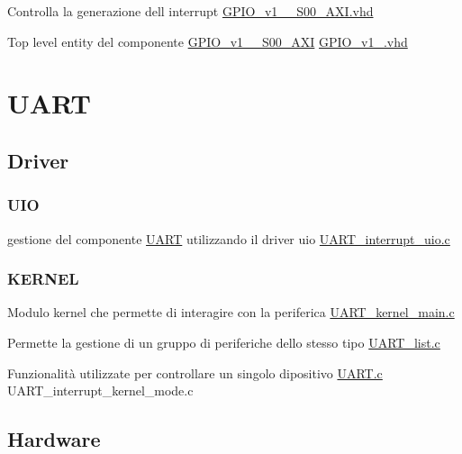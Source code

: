 \begin{DoxyItemize}
\item Controlla la generazione dell\textquotesingle{} interrupt \hyperlink{GPIO__v1__0__S00__AXI_8vhd}{G\+P\+I\+O\+\_\+v1\+\_\+\_\+\+S00\+\_\+\+A\+X\+I.\+vhd}
\item Top level entity del componente \hyperlink{classGPIO__v1__0__S00__AXI}{G\+P\+I\+O\+\_\+v1\+\_\+\_\+\+S00\+\_\+\+A\+XI} \hyperlink{GPIO__v1__0_8vhd}{G\+P\+I\+O\+\_\+v1\+\_.\+vhd} 
\end{DoxyItemize}\hypertarget{index_UART}{}\section{U\+A\+RT}\label{index_UART}
\hypertarget{index_Driver}{}\subsection{Driver}\label{index_Driver}
\hypertarget{index_UIO}{}\subsubsection{U\+IO}\label{index_UIO}

\begin{DoxyItemize}
\item gestione del componente \hyperlink{structUART}{U\+A\+RT} utilizzando il driver uio \hyperlink{UART__interrupt__uio_8c}{U\+A\+R\+T\+\_\+interrupt\+\_\+uio.\+c} 
\end{DoxyItemize}\hypertarget{index_KERNEL}{}\subsubsection{K\+E\+R\+N\+EL}\label{index_KERNEL}

\begin{DoxyItemize}
\item Modulo kernel che permette di interagire con la periferica \hyperlink{UART__kernel__main_8c}{U\+A\+R\+T\+\_\+kernel\+\_\+main.\+c}
\item Permette la gestione di un gruppo di periferiche dello stesso tipo \hyperlink{UART__list_8c}{U\+A\+R\+T\+\_\+list.\+c}
\item Funzionalità utilizzate per controllare un singolo dipositivo \hyperlink{UART_8c}{U\+A\+R\+T.\+c} U\+A\+R\+T\+\_\+interrupt\+\_\+kernel\+\_\+mode.\+c 
\end{DoxyItemize}\hypertarget{index_Hardware}{}\subsection{Hardware}\label{index_Hardware}

